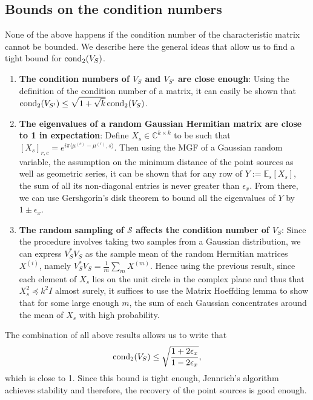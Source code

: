 \subsection{Bounds on the condition numbers}
None of the above happens if the condition number of the characteristic matrix cannot be bounded. We describe here the general ideas that allow us to find a tight bound for $\operatorname*{cond_2}(V_S)$.
\begin{enumerate}
    \item {\bf The condition numbers of $V_S$ and $V_{S'}$ are close enough}: Using the definition of the condition number of a matrix, it can easily be shown that $\operatorname*{cond_2}(V_{S'})\leq\sqrt{1+\sqrt{k}}\operatorname*{cond_2}(V_S)$.
    \item {\bf The eigenvalues of a random Gaussian Hermitian matrix are close to 1 in expectation}: Define $X_s\in\mathbb{C}^{k\times k}$ to be such that $[X_s]_{r,c}=e^{i\pi\langle\mu^{(c)}-\mu^{(r)},s\rangle}$. Then using the MGF of a Gaussian random variable, the assumption on the minimum distance of the point sources as well as geometric series, it can be shown that for any row of $Y:=\mathbb{E}_s[X_s]$, the sum of all its non-diagonal entries is never greater than $\epsilon_x$. From there, we can use Gershgorin's disk theorem to bound all the eigenvalues of $Y$ by $1\pm\epsilon_x$.
    \item {\bf The random sampling of $\mathcal{S}$ affects the condition number of $V_S$}: Since the procedure involves taking two samples from a Gaussian distribution, we can express $V_S^*V_S$ as the sample mean of the random Hermitian matrices $X^{(i)}$, namely $V_S^*V_S=\frac{1}{m}\sum_m X^{(m)}$. Hence using the previous result, since each element of $X_s$ lies on the unit circle in the complex plane and thus that $X_s^2\preceq k^2 I$ almost surely, it suffices to use the Matrix Hoeffding lemma to show that for some large enough $m$, the sum of each Gaussian concentrates around the mean of $X_s$ with high probability.
\end{enumerate}
The combination of all above results allows us to write that $$\operatorname*{cond_2}(V_S)\leq\sqrt{\frac{1+2\epsilon_x}{1-2\epsilon_x}},$$ which is close to 1. Since this bound is tight enough, Jennrich's algorithm achieves stability and therefore, the recovery of the point sources is good enough.